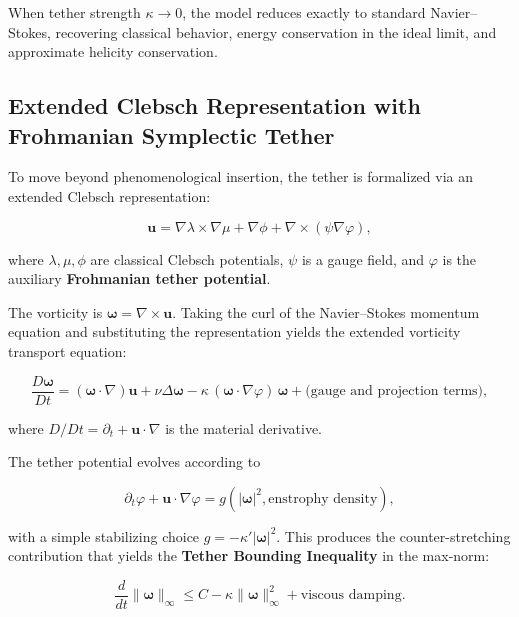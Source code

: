 \documentclass[11pt,a4paper]{article}
\begin{document}
When tether strength $\kappa \to 0$, the model reduces exactly to standard Navier--Stokes, recovering classical behavior, energy conservation in the ideal limit, and approximate helicity conservation.

\subsection{Extended Clebsch Representation with Frohmanian Symplectic Tether}

To move beyond phenomenological insertion, the tether is formalized via an extended Clebsch representation:

\begin{equation}
\mathbf{u} = \nabla\lambda \times \nabla\mu + \nabla\phi + \nabla \times (\psi \nabla \varphi),
\label{eq:clebsch_extended}
\end{equation}

where $\lambda, \mu, \phi$ are classical Clebsch potentials, $\psi$ is a gauge field, and $\varphi$ is the auxiliary \textbf{Frohmanian tether potential}.

The vorticity is $\boldsymbol{\omega} = \nabla \times \mathbf{u}$. Taking the curl of the Navier--Stokes momentum equation and substituting the representation yields the extended vorticity transport equation:

\begin{equation}
\frac{D \boldsymbol{\omega}}{Dt} = (\boldsymbol{\omega} \cdot \nabla) \mathbf{u} + \nu \Delta \boldsymbol{\omega} 
- \kappa \, (\boldsymbol{\omega} \cdot \nabla \varphi) \, \boldsymbol{\omega} 
+ \text{(gauge and projection terms)},
\label{eq:vorticity_extended}
\end{equation}

where $D/Dt = \partial_t + \mathbf{u} \cdot \nabla$ is the material derivative.

The tether potential evolves according to

\begin{equation}
\partial_t \varphi + \mathbf{u} \cdot \nabla \varphi = g(|\boldsymbol{\omega}|^2, \text{enstrophy density}),
\label{eq:phi_evolution}
\end{equation}

with a simple stabilizing choice $g = -\kappa' |\boldsymbol{\omega}|^2$. This produces the counter-stretching contribution that yields the \textbf{Tether Bounding Inequality} in the max-norm:

\begin{equation}
\frac{d}{dt} \|\boldsymbol{\omega}\|_\infty \leq C - \kappa \|\boldsymbol{\omega}\|_\infty^2 + \text{viscous damping}.
\label{eq:tether_bounding}
\end{equation}
\end{document}
